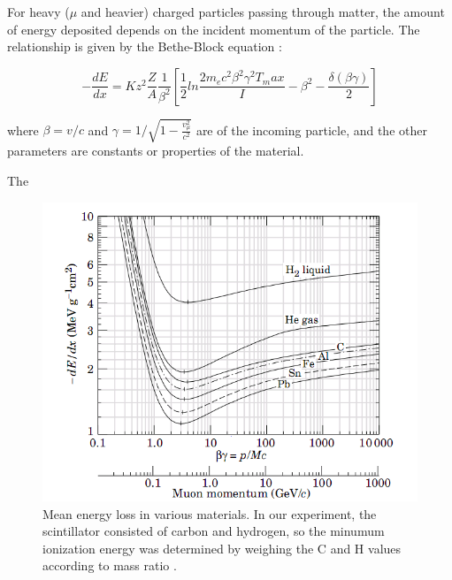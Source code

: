 

For heavy ($\mu$ and heavier) charged particles passing through
matter, the amount of energy deposited depends on the incident
momentum of the particle. The relationship is given by the Bethe-Block
equation \cite{bichsel}:

\begin{equation}
-\frac{dE}{dx} = Kz^2\frac{Z}{A}\frac{1}{\beta^2}\left[\frac{1}{2}ln\frac{2m_ec^2\beta^2\gamma^2T_max}{I} - \beta^2 - \frac{\delta(\beta\gamma)}{2}\right]
\end{equation}

where $\beta = v/c$ and $\gamma = 1/\sqrt{1 - \frac{v_{\mu}^2}{c^2}}$
are of the incoming particle, and the other parameters are constants
or properties of the material.

The 

\begin{figure}[h]
\begin{center}
\includegraphics[width = 185mm]{figures/energy_loss.png}
\caption{\small{Mean energy loss in various materials. In our
experiment, the scintillator consisted of carbon and hydrogen, so the
minumum ionization energy was determined by weighing the C and H
values according to mass ratio \cite{bichsel}.}}
\label{energy_loss}
\end{center}
\end{figure}
